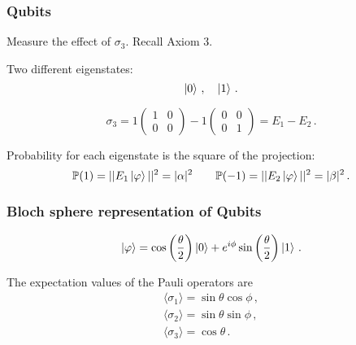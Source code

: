 \documentclass[12pt]{beamer}
\begin{document}
\begin{frame}
    \frametitle{Qubits}
    Measure the effect of $\sigma_3$. Recall Axiom 3. 

    Two different eigenstates:
    \begin{equation*}
        \ket{0} \,, \quad \ket{1} \,.
    \end{equation*}

    \begin{equation*}
        \sigma_3 = 1 \begin{pmatrix}
            1 & 0 \\  0 & 0
        \end{pmatrix} -1  \begin{pmatrix}
            0 & 0 \\  0 & 1
        \end{pmatrix} = E_1 - E_2 \,.
    \end{equation*}

    Probability for each eigenstate is the square of the projection:
    \begin{equation*}
        \mathbb{P}(1) = || E_1 \ket{\varphi}||^2 = |\alpha|^2 \qquad
        \mathbb{P}(-1) = || E_2 \ket{\varphi}||^2 = |\beta|^2 \,.
    \end{equation*}

\end{frame}


\begin{frame}
    \frametitle{Bloch sphere representation of Qubits}
    \begin{theorem}
        \begin{equation*}
            \ket{\varphi} = \cos \left( \frac{\theta}{2} \right)\ket{0} + e^{i\phi} \sin \left( \frac{\theta}{2}  \right) \ket{1} \,.
        \end{equation*}
    \end{theorem}

    \begin{theorem}
        The expectation values of the Pauli operators are
        \begin{gather*}
            \langle \sigma_1 \rangle = \sin \theta \cos \phi \,,  \\
            \langle \sigma_2 \rangle = \sin \theta \sin \phi \,, \\
            \langle \sigma_3 \rangle = \cos \theta \,.
        \end{gather*}
    \end{theorem}


\end{frame}

\printbibliography 
%
%
\end{document}
